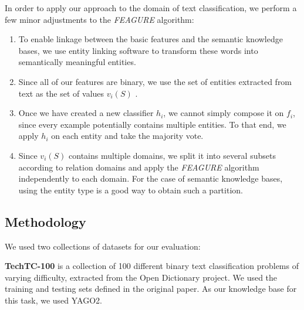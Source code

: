 \documentclass[twoside,11pt]{article}
\theoremstyle{definition}
\begin{document}
In order to apply our approach to the domain of text classification, we perform a few minor adjustments to the \emph{FEAGURE} algorithm:
\begin{enumerate}
	\item To enable linkage between the basic features and the semantic knowledge bases, we use entity linking software \cite{hoffart2011robust,milne2013open} to transform these words into semantically meaningful entities.
	\item Since all of our features are binary, we use the set of entities extracted from text	as the set of values $v_i(S)$ .
	\item Once we have created a new classifier $h_i$, we cannot simply compose it on $f_i$, since every example potentially contains multiple entities. To that end,  we apply $h_i$ on each entity and take the majority vote.
	\item Since $v_i(S)$ contains multiple domains,  we split it into several subsets according to relation domains and apply the \emph{FEAGURE} algorithm independently to each domain. For the case of semantic knowledge bases, using the entity type is a good way to obtain such a partition.
\end{enumerate}

\subsection{Methodology}

We used two collections of datasets for our evaluation:

\textbf{TechTC-100} \cite{gabrilovich2004text} is a collection of 100 different binary text classification problems of varying difficulty, extracted from the Open Dictionary project.
We used the training and testing sets defined in the original paper. 
As our knowledge base for this task, we used YAGO2.%
\end{document}
